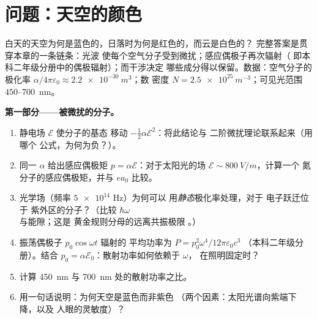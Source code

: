 \section{问题：天空的颜色}

\begin{problem}\label{pb:b3:perturbation-theory:1}
白天的天空为何是蓝色的，日落时为何是红色的，而云是白色的？
完整答案是贯穿本章的一条链条：光波
使每个空气分子受到微扰；感应偶极子再次辐射（
即本科二年级分册中的偶极辐射）；而干涉决定
哪些成分得以保留。数据：空气分子的极化率
$\alpha/4\pi\varepsilon_0 \approx \qty{2.2e-30}{m^3}$；数
密度 $N = \qty{2.5e25}{m^{-3}}$；可见光范围
$450$--\qty{700}{nm}。

\medskip\noindent\textbf{第一部分——被微扰的分子。}
\begin{enumerate}
  \item 静电场 $\mathcal E$ 使分子的基态
        移动 $-\tfrac12\alpha\mathcal E^2$：将此结论与
        二阶微扰理论联系起来（用哪个
        公式，为何为负？）。
  \item 同一 $\alpha$ 给出感应偶极矩 $p =
        \alpha\mathcal E$：对于太阳光的场 $\mathcal E \sim
        \qty{800}{V/m}$，计算一个
        氮分子的感应偶极矩，并与 $ea_0$ 比较。
  \item 光学场（频率 $\num{5e14}$ Hz）为何可以
        用\emph{静态}极化率处理，对于
        电子跃迁位于
        紫外区的分子？（比较 $\hbar\omega$ 与能隙；这是
        黄金规则分母的远离共振极限
        。）
  \item 振荡偶极子 $p_0\cos\omega t$ 辐射的
        平均功率为 $P = p_0^2\omega^4/12\pi\varepsilon_0c^3$
        （本科二年级分册）。结合 $p_0 = \alpha\mathcal
        E_0$：散射功率如何依赖于 $\omega$，
        在照明固定时？
  \item 计算 \qty{450}{nm}
        与 \qty{700}{nm} 处的散射功率之比。
  \item 用一句话说明：为何天空是蓝色而非紫色
        （两个因素：太阳光谱向紫端下降，以及
        人眼的灵敏度）？
\end{enumerate}


\end{problem}
